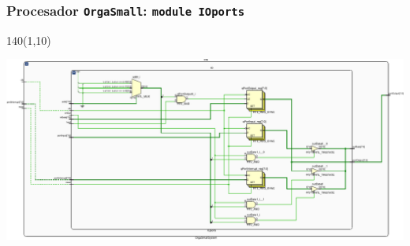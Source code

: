 \documentclass[aspectratio=169]{beamer}
\begin{document}
\begin{frame}[fragile,t]
    \frametitle{Procesador \texttt{OrgaSmall}: \texttt{module IOports}}
    \begin{textblock}{140}(1,10)
    \begin{center}
    \includegraphics[scale=0.85]{pdf/schematicIO-crop.pdf}
    \end{center}
    \end{textblock}
\end{frame}
\end{document}
